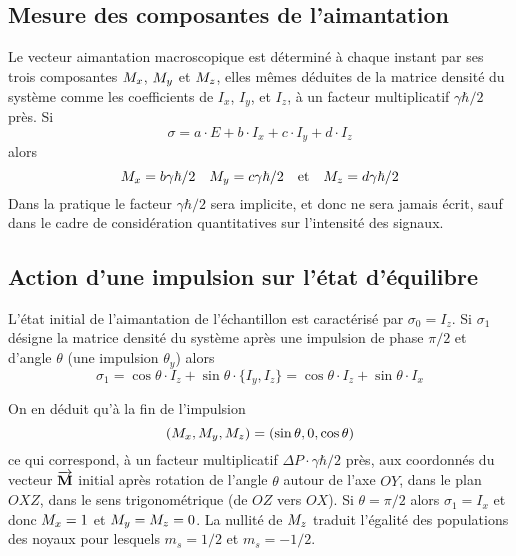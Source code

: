 \subsection{Mesure des composantes de l'aimantation}
Le vecteur aimantation macroscopique est déterminé à chaque instant par
ses trois composantes $M_x$, $M_y$ et $M_z$, elles mêmes
déduites de la matrice densité du système comme les coefficients
de $I_x$, $I_y$, et $I_z$, à un facteur multiplicatif $\gamma\hbar / 2$ près.
Si 
\begin{equation}
\sigma = a \cdot E + b \cdot I_x + c \cdot I_y + d \cdot I_z
\end{equation}
alors
\begin{equation}
M_x = b\gamma\hbar/2 \quad 
M_y = c\gamma\hbar/2 \quad \mbox{et} \quad 
M_z = d\gamma\hbar/2
\end{equation}
Dans la pratique le facteur $\gamma\hbar/2$ sera implicite, et donc ne
sera jamais écrit, sauf dans le cadre de considération quantitatives
sur l'intensité des signaux.

\subsection{Action d'une impulsion sur l'état d'équilibre}
L'état initial de l'aimantation de l'échantillon est caractérisé par $\sigma_0 = I_z$.
Si $\sigma_1$ désigne la matrice densité du système après une 
impulsion de phase $\pi/2$ et d'angle $\theta$ (une impulsion $\theta_y$) alors
\begin{equation}
\sigma_1 = \cos\theta \cdot I_z + \sin\theta \cdot \{I_y,I_z\} =  
\cos\theta \cdot I_z + \sin\theta \cdot I_x
\end{equation}

On en déduit qu'à la fin de l'impulsion
\begin{equation}
(M_x, M_y, M_z) = (\sin\theta, 0, \cos\theta)
\end{equation}
ce qui correspond, à un facteur multiplicatif $\Delta P \cdot \gamma\hbar/2$ près, 
aux coordonnés du vecteur $\overrightarrow{\mathbf{M}}$ initial après rotation de 
l'angle $\theta$ autour de l'axe $OY$, dans le plan $OXZ$, 
dans le sens trigonométrique (de $OZ$ vers $OX$).
Si $\theta = \pi/2$ alors $\sigma_1 = I_x$ et donc $M_x = 1$ et $M_y = M_z = 0$. 
La nullité de $M_z$ traduit l'égalité des populations des noyaux pour lesquels 
$m_s = 1/2$ et $m_s = -1/2$.

